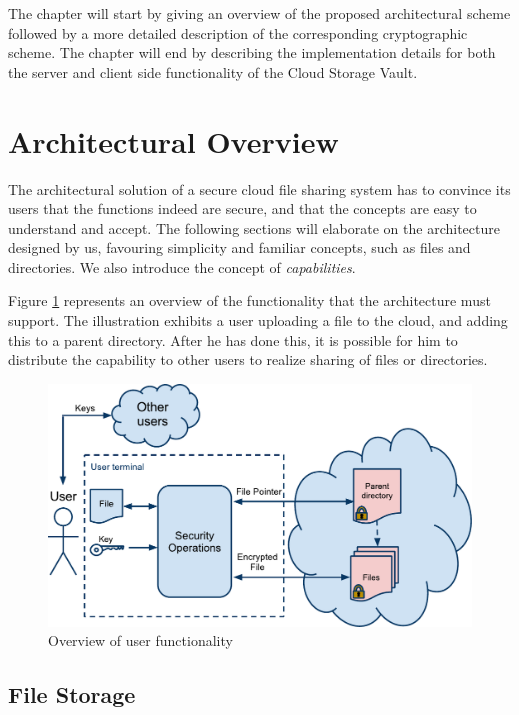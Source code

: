 \documentclass[pdftex,english,10pt,b5paper,twoside]{book}
\begin{document}
The chapter will start by giving an overview of the proposed architectural
scheme followed by a more detailed description of the corresponding
cryptographic scheme. The chapter will end by describing the implementation
details for both the server and client side functionality of the Cloud Storage Vault.

\section{Architectural Overview}
\label{chap:AS}

The architectural solution of a secure cloud file sharing system has to
convince its users that the functions indeed are secure, and that the concepts
are easy to understand and accept. The following sections will elaborate on the
architecture designed by us, favouring simplicity and familiar concepts, such
as files and directories. We also introduce the concept of \emph{capabilities}.

Figure \ref{fig:AS:overview} represents an overview of the functionality that
the architecture must support. The illustration exhibits a user uploading a
file to the cloud, and adding this to a parent directory. After he has done
this, it is possible for him to distribute the capability to other users to
realize sharing of files or directories.

\begin{figure}[h!]
    \centering
    \includegraphics[width=\columnwidth]{ArchitectureOverview.pdf}
    \caption{Overview of user functionality}
    \label{fig:AS:overview}
\end{figure}

\subsection{File Storage}
\label{sec:AS:FS}
\end{document}
